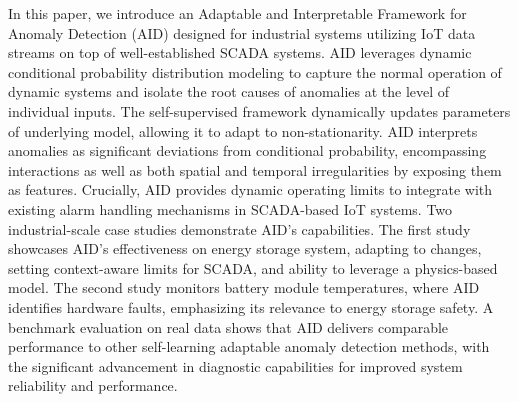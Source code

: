 In this paper, we introduce an Adaptable and Interpretable Framework for Anomaly Detection (AID) designed for industrial systems utilizing IoT data streams on top of well-established SCADA systems. AID leverages dynamic conditional probability distribution modeling to capture the normal operation of dynamic systems and isolate the root causes of anomalies at the level of individual inputs. The self-supervised framework dynamically updates parameters of underlying model, allowing it to adapt to non-stationarity. AID interprets anomalies as significant deviations from conditional probability, encompassing interactions as well as both spatial and temporal irregularities by exposing them as features. Crucially, AID provides dynamic operating limits to integrate with existing alarm handling mechanisms in SCADA-based IoT systems. Two industrial-scale case studies demonstrate AID's capabilities. The first study showcases AID's effectiveness on energy storage system, adapting to changes, setting context-aware limits for SCADA, and ability to leverage a physics-based model. The second study monitors battery module temperatures, where AID identifies hardware faults, emphasizing its relevance to energy storage safety. A benchmark evaluation on real data shows that AID delivers comparable performance to other self-learning adaptable anomaly detection methods, with the significant advancement in diagnostic capabilities for improved system reliability and performance.
